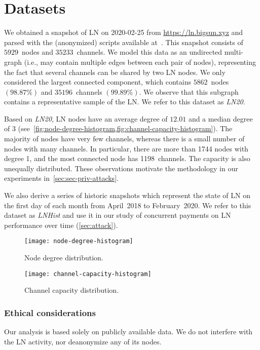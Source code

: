 \section{Datasets}
\label{sec:datasets}



We obtained a snapshot of LN on 2020-02-25 from \url{https://ln.bigsun.xyz} and parsed with the (anonymized) scripts available at~\cite{Tikhomirov2019}.
This snapshot consists of $5929$~nodes and $35233$~channels.
We model this data as an undirected multi-graph (i.e., may contain multiple edges between each pair of nodes), 
representing the fact that several channels can be shared by two LN nodes.
We only considered the largest connected component, 
which contains $5862$~nodes $(98.87\%)$ and $35196$~channels $(99.89\%)$.
We observe that this subgraph contains a representative sample of the LN.
We refer to this dataset as \emph{LN20}.

Based on \emph{LN20}, 
LN nodes have an average degree of $12.01$ and a median degree of $3$ (see~\cref{fig:node-degree-histogram,fig:channel-capacity-histogram}).
The majority of nodes have very few channels, 
whereas there is a small number of nodes with many channels. 
In particular, there are more than 1744 nodes with degree 1, and the most connected node has 1198~channels.
The capacity is also unequally distributed.
These observations motivate the methodology in our experiments in~\cref{sec:sec-priv-attacks}. 

We also derive a series of historic snapshots which represent the state of LN on the first day of each month from April~2018 to February~2020.
We refer to this dataset as \textit{LNHist} 
and use it in our study of concurrent payments on LN performance over time (\cref{sec:attack}).


\begin{figure}[tb]
	\centering
	\texttt{[image: node-degree-histogram]}
	\caption{Node degree distribution.\label{fig:node-degree-histogram}}
\end{figure}

\begin{figure}[tb]
	\centering
	\texttt{[image: channel-capacity-histogram]}
	\caption{Channel capacity distribution.\label{fig:channel-capacity-histogram}}
\end{figure}

\subsubsection*{Ethical considerations} 
Our analysis is based solely on publicly available data. 
We do not interfere with the LN activity, nor deanonymize any of its nodes. 
